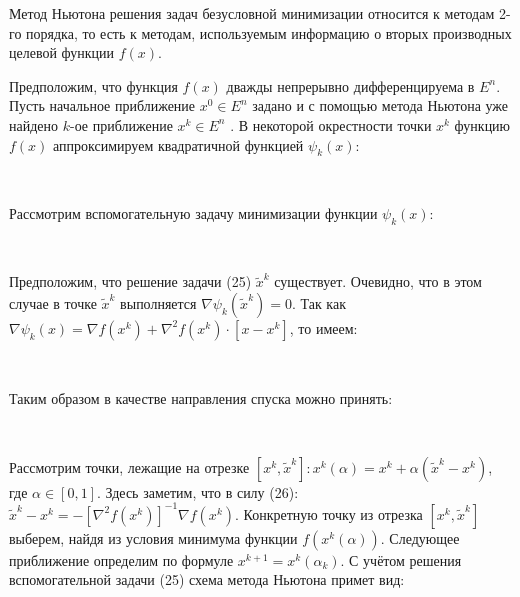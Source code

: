 
Метод Ньютона решения задач безусловной минимизации относится к методам 2-го порядка, то есть к методам, используемым информацию о вторых производных целевой функции $f(x)$.

Предположим, что функция $f(x)$ дважды непрерывно дифференцируема в $E^n$. Пусть начальное приближение $x^0 \in E^n$ задано и с помощью метода Ньютона уже найдено $k$-ое приближение $x^k \in E^n$ . В некоторой окрестности точки $x^k$ функцию $f(x)$ аппроксимируем квадратичной функцией $\psi_k(x)$:

\

Рассмотрим вспомогательную задачу минимизации функции $\psi_k(x)$:

\

Предположим, что решение задачи (25) $\tilde{x}^k$ существует. Очевидно, что в этом случае в точке $\tilde{x}^k$ выполняется $\nabla \psi_k (\tilde{x}^k) = 0$. Так как $\nabla \psi_k (x) = \nabla f(x^k) + \nabla^2 f(x^k) \cdot [x - x^k]$, то имеем:

\

Таким образом в качестве направления спуска можно принять:

\

Рассмотрим точки, лежащие на отрезке $[x^k, \tilde{x}^k] : x^k(\alpha) = x^k + \alpha (\tilde{x}^k - x^k)$, где $\alpha \in [0, 1]$. Здесь заметим, что в силу (26): $\tilde{x}^k - x^k = - [\nabla^2 f(x^k)]^{-1} \nabla f(x^k)$. Конкретную точку из отрезка $[x^k, \tilde{x}^k]$ выберем, найдя из условия минимума функции $f(x^k(\alpha))$. Следующее приближение определим по формуле $x^{k+1} = x^k(\alpha_k)$. С учётом решения вспомогательной задачи (25) схема метода Ньютона примет вид:

\


